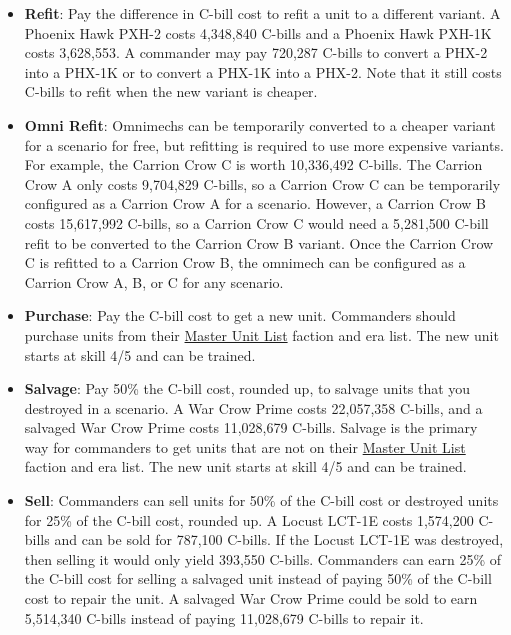 \documentclass[UTF8]{article}
\begin{document}
\begin{itemize}
\item {\bf Refit}: Pay the difference in C-bill cost to refit a unit to a different variant.
A Phoenix Hawk PXH-2 costs 4,348,840 C-bills and a Phoenix Hawk PXH-1K costs 3,628,553.
A commander may pay 720,287 C-bills to convert a PHX-2 into a PHX-1K or to convert a PHX-1K into a PHX-2.
Note that it still costs C-bills to refit when the new variant is cheaper.

\item {\bf Omni Refit}: Omnimechs can be temporarily converted to a cheaper variant for a scenario for free, but refitting is required to use more expensive variants.
For example, the Carrion Crow C is worth 10,336,492 C-bills.
The Carrion Crow A only costs 9,704,829 C-bills, so a Carrion Crow C can be temporarily configured as a Carrion Crow A for a scenario.
However, a Carrion Crow B costs 15,617,992 C-bills, so a Carrion Crow C would need a 5,281,500 C-bill refit to be converted to the Carrion Crow B variant.
Once the Carrion Crow C is refitted to a Carrion Crow B, the omnimech can be configured as a Carrion Crow A, B, or C for any scenario.

\item {\bf Purchase}: Pay the C-bill cost to get a new unit.
Commanders should purchase units from their \href{http://www.masterunitlist.info/}{Master Unit List} faction and era list.
The new unit starts at skill 4/5 and can be trained.

\item {\bf Salvage}: Pay 50\% the C-bill cost, rounded up, to salvage units that you destroyed in a scenario.
A War Crow Prime costs 22,057,358 C-bills, and a salvaged War Crow Prime costs 11,028,679 C-bills.
Salvage is the primary way for commanders to get units that are not on their \href{http://www.masterunitlist.info/}{Master Unit List} faction and era list.
The new unit starts at skill 4/5 and can be trained.

\item {\bf Sell}: Commanders can sell units for 50\% of the C-bill cost or destroyed units for 25\% of the C-bill cost, rounded up.
A Locust LCT-1E costs 1,574,200 C-bills and can be sold for 787,100 C-bills.
If the Locust LCT-1E was destroyed, then selling it would only yield 393,550 C-bills.
Commanders can earn 25\% of the C-bill cost for selling a salvaged unit instead of paying 50\% of the C-bill cost to repair the unit.
A salvaged War Crow Prime could be sold to earn 5,514,340 C-bills instead of paying 11,028,679 C-bills to repair it.

\end{itemize}
\end{document}
